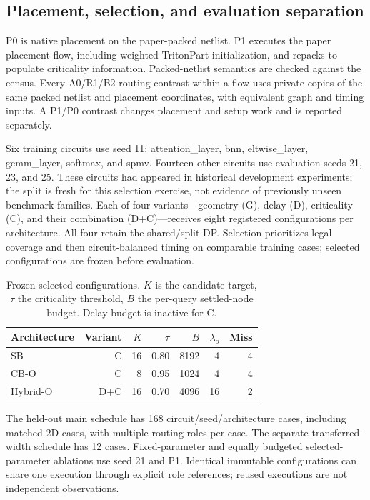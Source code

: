 \documentclass[conference,10pt]{IEEEtran}
\begin{document}
\subsection{Placement, selection, and evaluation separation}
P0 is native placement on the paper-packed netlist. P1 executes the paper placement flow, including weighted TritonPart initialization, and repacks to populate criticality information. Packed-netlist semantics are checked against the census. Every A0/R1/B2 routing contrast within a flow uses private copies of the same packed netlist and placement coordinates, with equivalent graph and timing inputs. A P1/P0 contrast changes placement and setup work and is reported separately.

Six training circuits use seed 11: attention\_layer, bnn, eltwise\_layer, gemm\_layer, softmax, and spmv. Fourteen other circuits use evaluation seeds 21, 23, and 25. These circuits had appeared in historical development experiments; the split is fresh for this selection exercise, not evidence of previously unseen benchmark families. Each of four variants---geometry (G), delay (D), criticality (C), and their combination (D+C)---receives eight registered configurations per architecture. All four retain the shared/split DP. Selection prioritizes legal coverage and then circuit-balanced timing on comparable training cases; selected configurations are frozen before evaluation.

\begin{table}[h]
\centering\caption{Frozen selected configurations. $K$ is the candidate target, $\tau$ the criticality threshold, $B$ the per-query settled-node budget. Delay budget is inactive for C.}
\label{tab:config}
\begin{tabular}{lrrrrrr}\hline
Architecture & Variant & $K$ & $\tau$ & $B$ & $\lambda_o$ & Miss\\\hline
SB & C &16&0.80&8192&4&4\\
CB-O & C &8&0.95&1024&4&4\\
Hybrid-O & D+C &16&0.70&4096&16&2\\\hline
\end{tabular}
\end{table}
The held-out main schedule has 168 circuit/seed/architecture cases, including matched 2D cases, with multiple routing roles per case. The separate transferred-width schedule has 12 cases. Fixed-parameter and equally budgeted selected-parameter ablations use seed 21 and P1. Identical immutable configurations can share one execution through explicit role references; reused executions are not independent observations.
\end{document}
